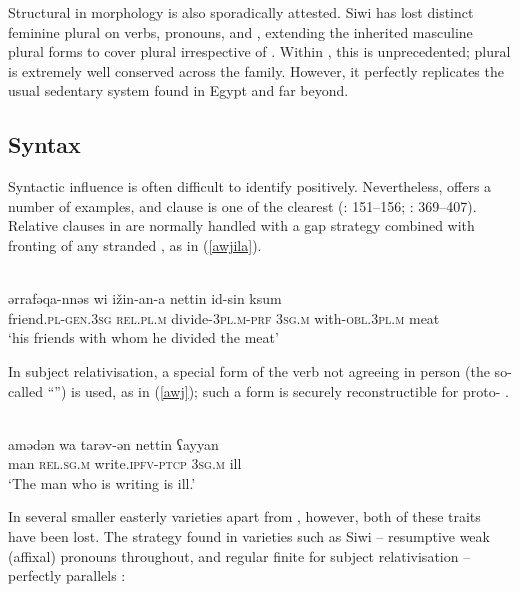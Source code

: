 \documentclass[output=paper]{langsci/langscibook}
\begin{document}
Structural  in morphology is also sporadically attested. Siwi has lost distinct feminine plural  on verbs, pronouns, and , extending the inherited masculine plural forms to cover plural  irrespective of . Within , this is unprecedented; plural   is extremely well conserved across the family. However, it perfectly replicates the usual sedentary  system found in Egypt and far beyond.


 
 \subsection{Syntax}


Syntactic influence is often difficult to identify positively.  Nevertheless,  offers a number of examples, and  clause  is one of the clearest (\citealt{Souag2013book}: 151–156; \citealt{Kossmann2013book}: 369–407). Relative clauses in  are normally handled with a gap strategy combined with fronting of any stranded , as in ‎(\ref{awjila}).

\ea
{ \citep[79]{Paradisi1961}}\\ \label{awjila}
\gll ərrafəqa-nnəs wi ižin-an-a nettin id-sin ksum\\
     friend\textsc{.pl}{}-\textsc{gen.}\textsc{3sg} \textsc{rel.pl.m} divide-\textsc{3pl.m-prf} 3\textsc{sg.m} with-\textsc{obl.}3\textsc{pl}.\textsc{m} meat\\
\glt `his friends with whom he divided the meat'
\z

In subject relativisation, a special form of the verb not agreeing in person (the so-called “”) is used, as in (\ref{awj}); such a form is securely reconstructible for proto- \citep{Kossmann2003}. 

\ea \label{awj}
{ \citep[162]{Paradisi1960}}\\
\gll amədən wa tarəv-ən nettin ʕayyan\\
     man \textsc{rel.sg.m} write.\textsc{ipfv-ptcp} \textsc{3sg.m} ill\\
\glt `The man who is writing is ill.'
\z

In several smaller easterly varieties apart from , however, both of these traits have been lost. The strategy found in varieties such as Siwi – resumptive weak (affixal) pronouns throughout, and regular finite  for subject relativisation – perfectly parallels : 
\end{document}
